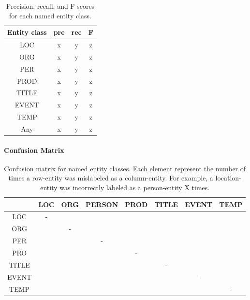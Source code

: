 \documentclass[11pt]{article}
\begin{document}
\begin{table}[t!]
\begin{center}
\begin{tabular}{cccc} 
Entity class & pre & rec & F \\
\hline
\noalign{\smallskip}
LOC  & x & y & z  \\
ORG  & x & y & z  \\
PER  & x & y & z  \\
PROD  & x & y & z  \\
TITLE  & x & y & z  \\
EVENT  & x & y & z  \\
TEMP  & x & y & z  \\
\hline
\noalign{\smallskip}
Any & x & y & z  \\
\end{tabular}
\end{center}
\caption{Precision, recall, and F-scores for each named entity class.}
\label{tab: precision recall and f-scores}
\end{table}


\paragraph{Confusion Matrix}


\begin{table}[t!]
\begin{center}
\begin{tabular}{cccccccc} 
& LOC & ORG & PERSON & PROD & TITLE & EVENT & TEMP \\
\hline
\noalign{\smallskip}
LOC  & - & & & & & &  \\
ORG  & & - & & & & &  \\
PER  & & & - & & & &  \\
PRO  & & & & - & & &  \\
TITLE  & & & & & - & &  \\
EVENT  & & & & & & - &  \\
TEMP  & & & & & & &  - \\
\end{tabular}
\end{center}
\caption{Confusion matrix for named entity classes. Each element represent the number of times a row-entity was mislabeled as a column-entity. For example, a location-entity was incorrectly labeled as a person-entity X times.}
\label{tab: confusion matrix}
\end{table}
\end{document}

